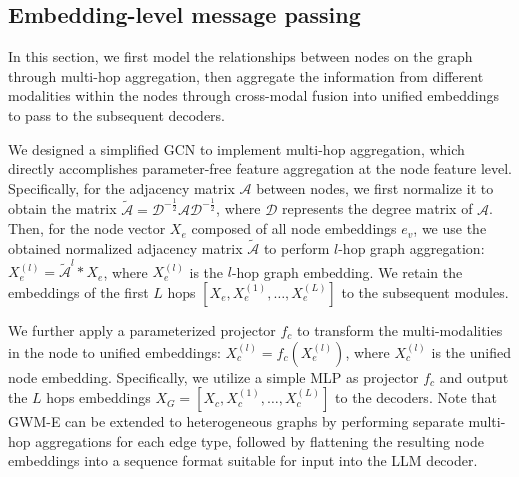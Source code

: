 




\subsection{Embedding-level message passing} 

In this section, we first model the relationships between nodes on the graph through multi-hop aggregation, then aggregate the information from different modalities within the nodes through cross-modal fusion into unified embeddings to pass to the subsequent decoders.

  We designed a simplified GCN \citep{wu2019simplifying,he2020lightgcn} to implement multi-hop aggregation, which directly accomplishes parameter-free feature aggregation at the node feature level. Specifically, for the adjacency matrix $\mathcal{A}$ between nodes, we first normalize it to obtain the matrix $\mathcal{\tilde{A}}=\mathcal{D}^{-\frac{1}{2}}\mathcal{A}\mathcal{D}^{-\frac{1}{2}}$, where $\mathcal{D}$ represents the degree matrix of $\mathcal{A}$. Then, for the node vector $X_e$ composed of all node embeddings $e_v$, we use the obtained normalized adjacency matrix $\mathcal{\tilde{A}}$ to perform $l$-hop graph aggregation: $X_{e}^{(l)}=\mathcal{\tilde{A}}^{l}*X_e$, where $X_{e}^{(l)}$ is the $l$-hop graph embedding. We retain the embeddings of the first $L$ hops $[X_e,X_{e}^{(1)},\ldots,X_{e}^{(L)}]$ to the subsequent modules.  





 We further apply a parameterized projector $f_c$ to transform the multi-modalities in the node to unified embeddings: $X_{c}^{(l)}=f_c(X_{e}^{(l)})$, where $X_{c}^{(l)}$ is the unified node embedding. Specifically, we utilize a simple MLP as projector $f_c$ and output the $L$ hops embeddings $X_G=[X_c, X_{c}^{(1)}, \ldots, X_{c}^{(L)}]$ to the decoders. Note that GWM-E can be extended to heterogeneous graphs by performing separate multi-hop aggregations for each edge type, followed by flattening the resulting node embeddings into a sequence format suitable for input into the LLM decoder.

